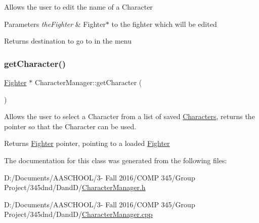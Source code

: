 Allows the user to edit the name of a Character 
\begin{DoxyParams}{Parameters}
{\em the\+Fighter} & Fighter$\ast$ to the fighter which will be edited \\
\hline
\end{DoxyParams}
\begin{DoxyReturn}{Returns}
destination to go to in the menu 
\end{DoxyReturn}
\hypertarget{class_character_manager_a2b13fedd6c3913ae52a9be8051300276}{}\label{class_character_manager_a2b13fedd6c3913ae52a9be8051300276} 
\subsubsection{\texorpdfstring{get\+Character()}{getCharacter()}}
{\footnotesize\ttfamily \hyperlink{class_fighter}{Fighter} $\ast$ Character\+Manager\+::get\+Character (\begin{DoxyParamCaption}{ }\end{DoxyParamCaption})\hspace{0.3cm}{\ttfamily [static]}}

Allows the user to select a Character from a list of saved \hyperlink{class_characters}{Characters}, returns the pointer so that the Character can be used. \begin{DoxyReturn}{Returns}
\hyperlink{class_fighter}{Fighter} pointer, pointing to a loaded \hyperlink{class_fighter}{Fighter} 
\end{DoxyReturn}


The documentation for this class was generated from the following files\+:\begin{DoxyCompactItemize}
\item 
D\+:/\+Documents/\+A\+A\+S\+C\+H\+O\+O\+L/3-\/ Fall 2016/\+C\+O\+M\+P 345/\+Group Project/345dnd/\+Dand\+D/\hyperlink{_character_manager_8h}{Character\+Manager.\+h}\item 
D\+:/\+Documents/\+A\+A\+S\+C\+H\+O\+O\+L/3-\/ Fall 2016/\+C\+O\+M\+P 345/\+Group Project/345dnd/\+Dand\+D/\hyperlink{_character_manager_8cpp}{Character\+Manager.\+cpp}\end{DoxyCompactItemize}
